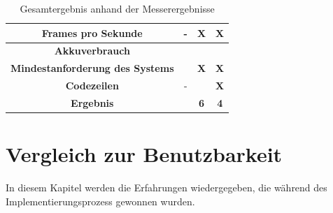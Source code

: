 \begin{table}[htbp]
{\begin{tabular}{cccc}
			\multicolumn{1}{|c|}{\textbf{Frames pro Sekunde}}                                                            & \multicolumn{1}{c|}{-}                  & \multicolumn{1}{c|}{\textbf{X}}                   & \multicolumn{1}{c|}{\textbf{X}}                   \\ \hline
			\multicolumn{1}{|c|}{\textbf{Akkuverbrauch}}                                                                & \multicolumn{1}{c|}{}                  & \multicolumn{1}{c|}{}                   & \multicolumn{1}{c|}{}                   \\ \hline
			\multicolumn{1}{|c|}{\textbf{Mindestanforderung des Systems}}                                                                             &  \multicolumn{1}{c|}{\textbf{}}                  & \multicolumn{1}{c|}{\textbf{X}}                   & \multicolumn{1}{c|}{\textbf{X}}                   \\ \hline
			\multicolumn{1}{|c|}{\textbf{Codezeilen}}                                                                             & \multicolumn{1}{c|}{-}                  & \multicolumn{1}{c|}{}                   & \multicolumn{1}{c|}{\textbf{X}}                   \\ \hline
			\multicolumn{1}{|c|}{\textbf{Ergebnis}}                                                                             & \multicolumn{1}{c|}{}                  & \multicolumn{1}{c|}{\textbf{6}}                   & \multicolumn{1}{c|}{\textbf{4}}                   \\ \hline
		\end{tabular}
	}
	\caption{Gesamtergebnis anhand der Messerergebnisse}\label{protokoll_gesamt}
\end{table}


\chapter{Vergleich zur Benutzbarkeit}
In diesem Kapitel werden die Erfahrungen wiedergegeben, die während des Implementierungsprozess gewonnen wurden.

